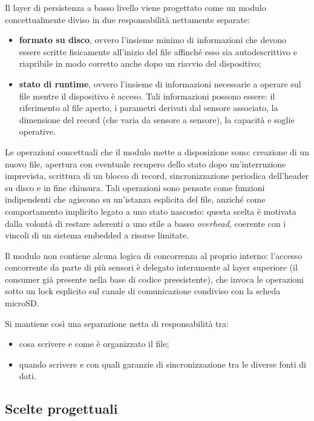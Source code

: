 Il layer di persistenza a basso livello viene progettato come un modulo concettualmente diviso in due responsabilità nettamente separate:

\begin{itemize}
    \item \textbf{formato su disco}, ovvero l'insieme minimo di informazioni che devono essere scritte fisicamente all'inizio del file
    affinché esso sia autodescrittivo e riapribile in modo corretto anche dopo un riavvio del dispositivo;
    \item \textbf{stato di runtime}, ovvero l'insieme di informazioni necessarie a operare sul file mentre il dispositivo è acceso. Tali informazioni possono essere: 
    il riferimento al file aperto, i parametri derivati dal sensore associato, la dimensione del \gls{record} (che varia da sensore a sensore), la capacità e 
    soglie operative.
\end{itemize}

Le operazioni concettuali che il modulo mette a disposizione sono: creazione di un nuovo file, apertura con eventuale recupero dello stato dopo
un'interruzione imprevista, scrittura di un blocco di record, sincronizzazione periodica dell'header su disco e in fine chiusura. Tali operazioni sono pensate
come funzioni indipendenti che agiscono su un'istanza esplicita del file, anziché come comportamento implicito legato a uno stato nascosto: questa
scelta è motivata dalla volontà di restare aderenti a uno stile a basso \textit{overhead}, coerente con i vincoli di un sistema embedded a risorse limitate.

Il modulo non contiene alcuna logica di concorrenza al proprio interno: l'accesso concorrente da parte di più sensori è delegato interamente al layer
superiore (il consumer già presente nella base di codice preesistente), che invoca le operazioni sotto un lock esplicito sul canale di comunicazione
condiviso con la scheda microSD.

Si mantiene così una separazione netta di responsabilità tra:
\begin{itemize}
    \item cosa scrivere e come è organizzato il file;
    \item quando scrivere e con quali garanzie di sincronizzazione tra le diverse fonti di dati.
\end{itemize}

\subsection{Scelte progettuali}

